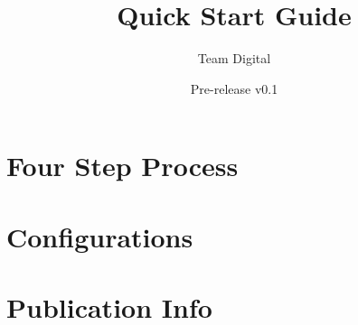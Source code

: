 \documentclass[11pt]{book}
\title{Quick Start Guide}
\author{Team Digital}
\date{Pre-release v0.1}
\begin{document}
\maketitle
\def\title#1{\chapter{#1}}
\tableofcontents

        
        
\part{Four Step Process}
        
        
        
        
        
        
        
        
\part{Configurations}
        
        
\part{Publication Info}
        
        


\printbibliography[title={Bibliography}]
\end{document}
